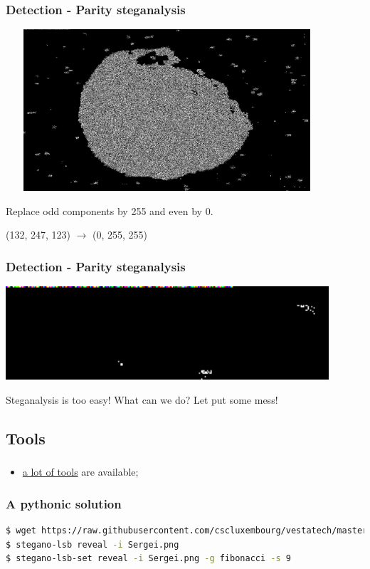 \documentclass[]{beamer}
\begin{document}
\begin{frame}
\frametitle{Detection - Parity steganalysis}
\begin{center}
    \includegraphics[height=6.0cm, width=12.0cm]{./images/vesta_steg.png}
\end{center}
Replace odd components by 255 and even by 0.

(132, 247, 123) $\longrightarrow$ (0, 255, 255)
\end{frame}

\begin{frame}
\frametitle{Detection - Parity steganalysis}
\begin{center}
\includegraphics[width=12.0cm]{./images/vesta_steg_zoom.png}
\end{center}
\bigskip
Steganalysis is too easy! What can we do? Let put some mess!
\end{frame}


\subsection{Tools}
\begin{frame}
\frametitle{}
\begin{itemize}
    \item \href{https://github.com/topics/steganography}{a lot of tools} are available;
\end{itemize}
\end{frame}

\begin{frame}[fragile]
\frametitle{A pythonic solution}
\begin{lstlisting}[language=Bash]
$ wget https://raw.githubusercontent.com/cscluxembourg/vestatech/master/challenges/sergei/Sergei.png
$ stegano-lsb reveal -i Sergei.png
$ stegano-lsb-set reveal -i Sergei.png -g fibonacci -s 9
\end{lstlisting}
\end{frame}
\end{document}
